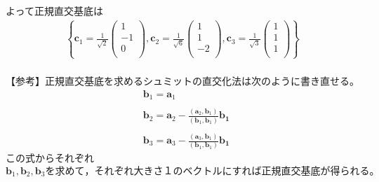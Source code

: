\documentclass[dvipdfmx,uplatex,11pt]{jsarticle}
\begin{document}
よって正規直交基底は
\begin{eqnarray*}
\left\{
\bm{c}_1=\frac{1}{\sqrt{2}}
\begin{pmatrix}
1 \\
-1 \\
0 \\
\end{pmatrix}
,
\bm{c}_2 =\frac{1}{\sqrt{6}}
\begin{pmatrix}
1 \\
1 \\
-2 \\
\end{pmatrix}
,
\bm{c}_3 =\frac{1}{\sqrt{3}}
\begin{pmatrix}
1 \\
1 \\
1 \\
\end{pmatrix}
\right\}
\end{eqnarray*}
\dotfill \\
【参考】正規直交基底を求めるシュミットの直交化法は次のように書き直せる。
\begin{eqnarray*}
& \bm{b}_1 =\bm{a}_1 \\ \\
& \bm{b}_2 =\bm{a}_2-\frac{(\bm{a}_2 ,\bm{b}_1)}{(\bm{b}_1 ,\bm{b}_1 )}\bm{b_1} \\ \\
& \bm{b}_3 =\bm{a}_3-\frac{(\bm{a}_3 ,\bm{b}_1)}{(\bm{b}_1 ,\bm{b}_1 )}\bm{b_1} 
\end{eqnarray*}
この式からそれぞれ$\bm{b}_1, \bm{b}_2, \bm{b}_3 を求めて，それぞれ大きさ１のベクトルにすれば正規直交基底が得られる。$
%
%
%
\newpage
%
%
%
\end{document}
